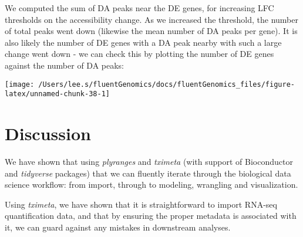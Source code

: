 \documentclass[
  9pt,
  a4paper,
]{extarticle}
\newenvironment{Shaded}{\begin{snugshade}}{\end{snugshade}}
\newcommand{\DataTypeTok}[1]{\textcolor[rgb]{0.13,0.29,0.53}{#1}}
\newcommand{\KeywordTok}[1]{\textcolor[rgb]{0.13,0.29,0.53}{\textbf{#1}}}
\newcommand{\NormalTok}[1]{#1}
\newcommand{\OperatorTok}[1]{\textcolor[rgb]{0.81,0.36,0.00}{\textbf{#1}}}
\newcommand{\StringTok}[1]{\textcolor[rgb]{0.31,0.60,0.02}{#1}}
\begin{document}
We computed the sum of DA peaks near the DE genes, for increasing LFC
thresholds on the accessibility change. As we increased the threshold, the
number of total peaks went down (likewise the mean number of DA peaks per
gene). It is also likely the number of DE genes with a DA peak nearby with such
a large change went down - we can check this by plotting the number of DE genes
against the number of DA peaks:

\begin{Shaded}
\end{Shaded}

\begin{center}\texttt{[image: /Users/lee.s/fluentGenomics/docs/fluentGenomics\_files/figure-latex/unnamed-chunk-38-1]} \end{center}

\hypertarget{discussion}{%
\section{Discussion}\label{discussion}}

We have shown that using \emph{plyranges} and \emph{tximeta} (with support of
Bioconductor and \emph{tidyverse} packages) that we can fluently iterate through the
biological data science workflow: from import, through to modeling, wrangling
and visualization.

Using \emph{tximeta}, we have shown that it is straightforward to import RNA-seq
quantification data, and that by ensuring the proper metadata is associated
with it, we can guard against any mistakes in downstream analyses.
\end{document}

